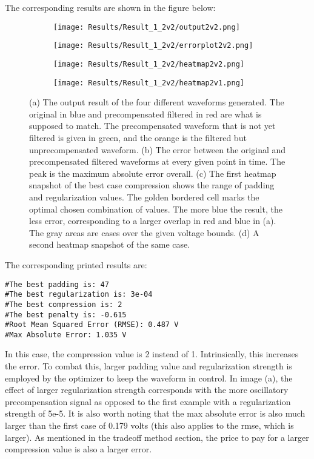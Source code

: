 \documentclass[11pt, a4paper]{article}
\theoremstyle{definition}
\numberwithin{equation}{section}
\begin{document}
The corresponding results are shown in the figure below:

\begin{figure}[hbt!]
\centering
\begin{subfigure}{.45\linewidth}
  \centering
  \texttt{[image: Results/Result\_1\_2v2/output2v2.png]}
  \subcaption{}
  \label{output2v2}
\end{subfigure}
\quad
\begin{subfigure}{.45\linewidth}
  \centering
  \texttt{[image: Results/Result\_1\_2v2/errorplot2v2.png]}
  \subcaption{}
  \label{errorplot2v2}
\end{subfigure}
\begin{subfigure}{.45\linewidth}
  \centering
  \texttt{[image: Results/Result\_1\_2v2/heatmap2v2.png]}
  \subcaption{}
  \label{heatmap2v2}
\end{subfigure}
\quad
\begin{subfigure}{.45\linewidth}
  \centering
  \texttt{[image: Results/Result\_1\_2v2/heatmap2v1.png]}
  \caption{}
  \label{heatmap2v2}
\end{subfigure}
\caption{(a) The output result of the four different waveforms generated. The original in blue and precompensated filtered in red are what is supposed to match. The precompensated waveform that is not yet filtered is given in green, and the orange is the filtered but unprecompensated waveform. (b) The error between the original and precompensated filtered waveforms at every given point in time. The peak is the maximum absolute error overall. (c) The first heatmap snapshot of the best case compression shows the range of padding and regularization values. The golden bordered cell marks the optimal chosen combination of values. The more blue the result, the less error, corresponding to a larger overlap in red and blue in (a). The gray areas are cases over the given voltage bounds. (d) A second heatmap snapshot of the same case.}
\label{fig:1v2}
\end{figure}

The corresponding printed results are:
 
\begin{verbatim}
#The best padding is: 47
#The best regularization is: 3e-04
#The best compression is: 2
#The best penalty is: -0.615
#Root Mean Squared Error (RMSE): 0.487 V
#Max Absolute Error: 1.035 V
\end{verbatim}

In this case, the compression value is 2 instead of 1. Intrinsically, this increases the error. To combat this, larger padding value and regularization strength is employed by the optimizer to keep the waveform in control. In image (a), the effect of larger regularization strength corresponds with the more oscillatory precompensation signal as opposed to the first example with a regularization strength of 5e-5. It is also worth noting that the max absolute error is also much larger than the first case of 0.179 volts (this also applies to the rmse, which is larger). As mentioned in the tradeoff method section, the price to pay for a larger compression value is also a larger error.
\end{document}
